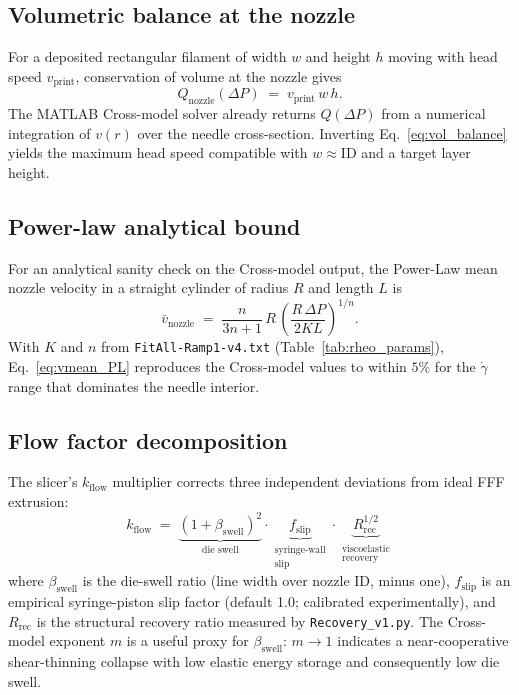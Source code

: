 \documentclass[11pt,a4paper]{article}
\begin{document}
\subsection{Volumetric balance at the nozzle}
For a deposited rectangular filament of width $w$ and height $h$ moving with head
speed $v_\mathrm{print}$, conservation of volume at the nozzle gives
\begin{equation}
Q_\mathrm{nozzle}(\Delta P) \;=\; v_\mathrm{print}\,w\,h.
\label{eq:vol_balance}
\end{equation}
The MATLAB Cross-model solver already returns $Q(\Delta P)$ from a numerical
integration of $v(r)$ over the needle cross-section. Inverting
Eq.~\ref{eq:vol_balance} yields the maximum head speed compatible with $w \approx
\mathrm{ID}$ and a target layer height.

\subsection{Power-law analytical bound}
For an analytical sanity check on the Cross-model output, the Power-Law mean
nozzle velocity in a straight cylinder of radius $R$ and length $L$ is
\begin{equation}
\bar v_\mathrm{nozzle} \;=\; \frac{n}{3n+1}\,R\,
\left(\frac{R\,\Delta P}{2KL}\right)^{1/n}.
\label{eq:vmean_PL}
\end{equation}
With $K$ and $n$ from \texttt{FitAll-Ramp1-v4.txt} (Table~\ref{tab:rheo_params}),
Eq.~\ref{eq:vmean_PL} reproduces the Cross-model values to within $5\%$ for the
$\dot\gamma$ range that dominates the needle interior.

\subsection{Flow factor decomposition}
The slicer's $k_\mathrm{flow}$ multiplier corrects three independent deviations
from ideal FFF extrusion:
\begin{equation}
k_\mathrm{flow} \;=\; \underbrace{(1+\beta_\mathrm{swell})^{2}}_{\text{die swell}}
\cdot
\underbrace{f_\mathrm{slip}}_{\substack{\text{syringe-wall}\\\text{slip}}}
\cdot
\underbrace{R_\mathrm{rec}^{1/2}}_{\substack{\text{viscoelastic}\\\text{recovery}}}
\label{eq:kflow}
\end{equation}
where $\beta_\mathrm{swell}$ is the die-swell ratio (line width over nozzle ID,
minus one), $f_\mathrm{slip}$ is an empirical syringe-piston slip factor (default
1.0; calibrated experimentally), and $R_\mathrm{rec}$ is the structural recovery
ratio measured by \texttt{Recovery\_v1.py}. The Cross-model exponent $m$ is a
useful proxy for $\beta_\mathrm{swell}$: $m \to 1$ indicates a near-cooperative
shear-thinning collapse with low elastic energy storage and consequently low die
swell.
\end{document}
